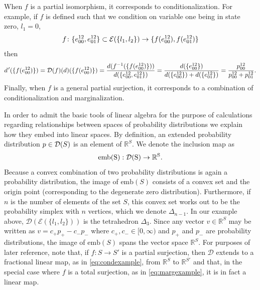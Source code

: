 When $f$ is a partial isomorphism, it corresponds to conditionalization. For example, if $f$ is defined such that we condition on variable one being in state zero, $l_1 = 0$,
\begin{equation}
f \colon \{ e^{12}_{00} , e^{12}_{01} \} \subset \mathcal{E} ( \{ l_1, l_2 \} ) \to \{ f(e^{12}_{00}) , f(e^{12}_{01}) \}
\end{equation}
then
\begin{equation}\label{eq:condexample}
d\hspace{.09em}'(\{ f(e^{12}_{00}) \} ) = \mathcal{D} (f)(d)( \{ f(e^{12}_{00}) \}) = \frac{d( f^{-1}( \{ f(e^{12}_{00}) \}) )}{d(\{ e^{12}_{00},e^{12}_{01} \})} = \frac{d(\{ e^{12}_{00} \})}{d( \{ e^{12}_{00} \} ) + d( \{ e^{12}_{01} \} )} = \frac{p^{12}_{00}}{p^{12}_{00} + p^{12}_{01}}.
\end{equation}
Finally, when $f$ is a general partial surjection, it corresponds to a combination of conditionalization and marginalization.

In order to admit the basic tools of linear algebra for the purpose of calculations regarding relationships between spaces of probability distributions we explain how they embed into linear spaces. By definition, an extended probability distribution $p \in \mathcal{D}(S)$ is an element of $\mathbb{R}^S$. We denote the inclusion map as
\begin{equation}\label{eq:emb}
\rm{emb}(S) : \mathcal{D}(S) \to \mathbb{R}^S.
\end{equation}
Because a convex combination of two probability distributions is again a probability distribution, the image of $\mathrm{emb}(S)$ consists of a convex set and the origin point (corresponding to the degenerate zero distribution).  Furthermore, if $n$ is the number of elements of the set $S$, this convex set works out to be the probability simplex with $n$ vertices, which we denote $\Delta_{n-1}$.  In our example above, $\mathcal{D}(\mathcal{E}(\{l_1,l_2\}))$ is the tetrahedron $\Delta_3$. Since any vector $v \in \mathbb{R}^S$ may be written as $v = c_{+} p_{+} - c_{-} p_{-}$ where $c_{+}, c_{-} \in [0,\infty)$ and $p_{+}$ and $p_{-}$ are probability distributions, the image of $\mathrm{emb}(S)$ spans the vector space $\mathbb{R}^S$.  For purposes of later reference, note that, if $f \colon S \to S'$ is a partial surjection, then $\mathcal{D}$ extends to a fractional linear map, as in \autoref{eq:condexample}, from $\mathbb{R}^S$ to $\mathbb{R}^{S'}$ and that, in the special case where $f$ is a total surjection, as in \autoref{eq:margexample}, it is in fact a linear map.

